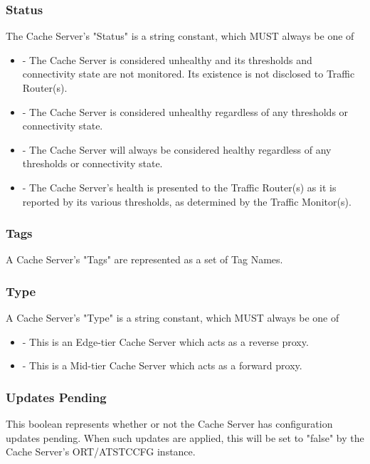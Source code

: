 \subsubsection{Status}
The Cache Server's "Status" is a string constant, which MUST always be one of

\begin{itemize}
	\item {} - The Cache Server is considered unhealthy and its
	thresholds and connectivity state are not monitored. Its existence is not
	disclosed to Traffic Router(s).
	\item {} - The Cache Server is considered unhealthy regardless
	of any thresholds or connectivity state.
	\item {} - The Cache Server will always be considered healthy
	regardless of any thresholds or connectivity state.
	\item {} - The Cache Server's health is presented to the
	Traffic Router(s) as it is reported by its various thresholds, as determined
	by the Traffic Monitor(s).
\end{itemize}

\subsubsection{Tags}
A Cache Server's "Tags" are represented as a set of Tag Names.

\subsubsection{Type}
A Cache Server's "Type" is a string constant, which MUST always be one of

\begin{itemize}
	\item {} - This is an Edge-tier Cache Server which acts as a
	reverse proxy.
	\item {} - This is a Mid-tier Cache Server which acts as a forward
	proxy.
\end{itemize}

\subsubsection{Updates Pending}
This boolean represents whether or not the Cache Server has configuration
updates pending. When such updates are applied, this will be set to "false" by
the Cache Server's ORT/ATSTCCFG instance.


